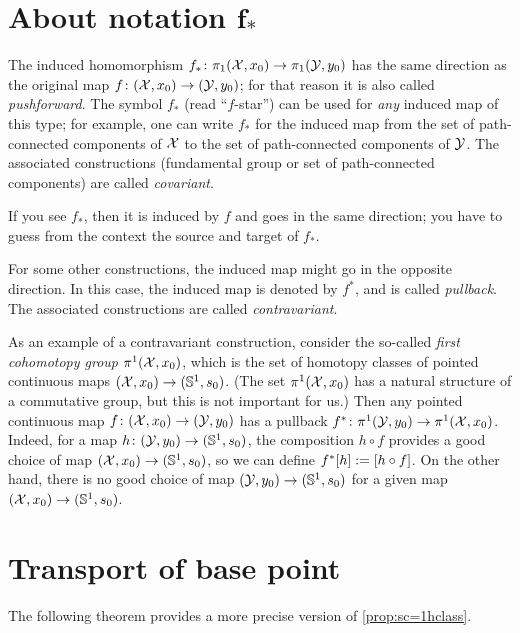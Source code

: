 \section[About notation f⁎]{About notation $\bm{f_*}$}

The induced homomorphism $f_*\colon\pi_1(\mathcal{X},x_0)\to \pi_1(\mathcal{Y},y_0)$ has the same direction as the original map $f\colon(\mathcal{X},x_0)\to (\mathcal{Y},y_0)$; for that reason it is also called \emph{pushforward}.
The symbol $f_*$ (read ``$f$-star'') can be used for \textit{any} induced map of this type; for example,
one can write $f_*$ for the induced map from the set of path-connected components of $\mathcal{X}$ to the set of path-connected components of $\mathcal{Y}$.
The associated constructions (fundamental group or set of path-connected components) are called \emph{covariant}.

If you see $f_*$, then it is induced by $f$ and goes in the same direction; you have to guess from the context the source and target of $f_*$.

For some other constructions, the induced map might go in the opposite direction.
In this case, the induced map is denoted by $f^*$, and is called \emph{pullback}.
The associated constructions are called \emph{contravariant}.

As an example of a contravariant construction, consider the so-called \emph{first cohomotopy group} $\pi^1(\mathcal{X},x_0)$, which is the set of homotopy classes of pointed continuous maps $(\mathcal{X},x_0)\to (\mathbb{S}^1,s_0)$.
(The set $\pi^1(\mathcal{X},x_0)$ has a natural structure of a commutative group, but this is not important for us.)
Then any pointed continuous map $f\colon(\mathcal{X},x_0)\to (\mathcal{Y},y_0)$ has a pullback $f^*\colon\pi^1(\mathcal{Y},y_0)\to\pi^1(\mathcal{X},x_0)$.
Indeed, for a map $h\colon(\mathcal{Y},y_0)\to (\mathbb{S}^1,s_0)$, the composition $h\circ f$ provides a good choice of map $(\mathcal{X},x_0)\to (\mathbb{S}^1,s_0)$, so we can define $f^*[h]\mathrel{:=} [h\circ f]$.
On the other hand, there is no good choice of map $(\mathcal{Y},y_0)\to (\mathbb{S}^1,s_0)$ for a given map $(\mathcal{X},x_0)\to (\mathbb{S}^1,s_0)$.


\section{Transport of base point}

The following theorem provides a more precise version of \ref{prop:sc=1hclass}.

